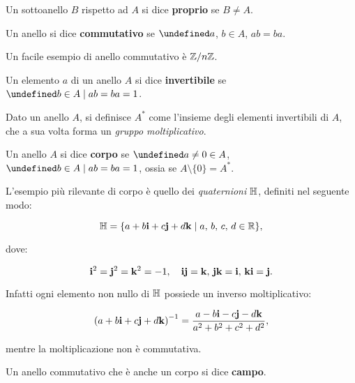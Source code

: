 \documentclass[a4paper]{article}
\let\oldforall\forall
\let\forall\undefined
\DeclareMathOperator{\forall}{\oldforall}
\let\oldexists\exists
\let\exists\undefined
\DeclareMathOperator{\exists}{\oldexists}
\begin{document}
\begin{definition}
    Un sottoanello $B$ rispetto ad $A$ si dice \textbf{proprio} se
    $B \neq A$.
\end{definition}

\begin{definition}
    Un anello si dice \textbf{commutativo} se $\forall a$, $b \in A$, $ab=ba$.
\end{definition}

\begin{example}
    Un facile esempio di anello commutativo è $\mathbb{Z}/n\mathbb{Z}$.
\end{example}

\begin{definition}
    Un elemento $a$ di un anello $A$ si dice \textbf{invertibile} se
    $\exists b \in A \mid ab = ba = 1$.
\end{definition}

\begin{definition}
    Dato un anello $A$, si definisce $A^*$ come l'insieme degli elementi
    invertibili di $A$, che a sua volta forma un \textit{gruppo moltiplicativo}.
\end{definition}

\begin{definition}
    Un anello $A$ si dice \textbf{corpo} se $\forall a \neq 0 \in A$, $\exists b \in A \mid ab=ba=1$,
    ossia se $A \setminus \{0\} = A^*$.
\end{definition}

\begin{example}
    L'esempio più rilevante di corpo è quello dei \textit{quaternioni} $\mathbb{H}$, definiti
    nel seguente modo:

    \[\mathbb{H} = \{a+b\mathbf{i}+c\mathbf{j}+d\mathbf{k} \mid a,\, b,\, c,\, d \in \mathbb{R}\},\]

    dove:

    \[\mathbf{i}^2 = \mathbf{j}^2 = \mathbf{k}^2 = -1, \quad \mathbf{i}\mathbf{j} = \mathbf{k},\, \mathbf{j}\mathbf{k} = \mathbf{i},\, \mathbf{k}\mathbf{i} = \mathbf{j}. \]

    Infatti ogni elemento non nullo di $\mathbb{H}$ possiede un inverso moltiplicativo:

    \[\left(a+b\mathbf{i}+c\mathbf{j}+d\mathbf{k}\right)^{-1} = \frac{a-b\mathbf{i}-c\mathbf{j}-d\mathbf{k}}{a^2+b^2+c^2+d^2},\]

    mentre la moltiplicazione non è commutativa.

\end{example}

\begin{definition}
    Un anello commutativo che è anche un corpo si dice \textbf{campo}.
\end{definition}
\end{document}
